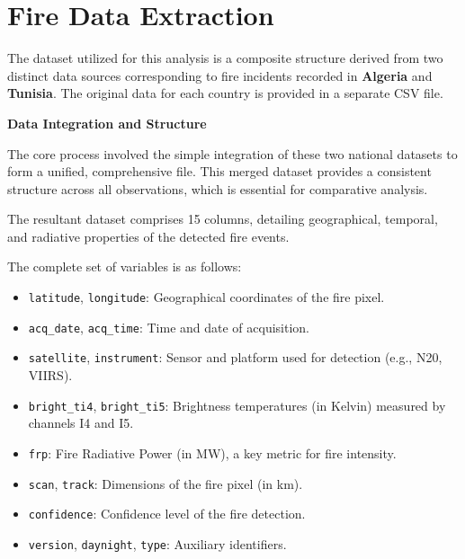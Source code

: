 \section{Fire Data Extraction}

\label{sec:dataset_composition}

The dataset utilized for this analysis is a composite structure derived from two distinct data sources corresponding to fire incidents recorded in \textbf{Algeria} and \textbf{Tunisia}. The original data for each country is provided in a separate CSV file.

\textbf{Data Integration and Structure}

The core process involved the simple integration of these two national datasets to form a unified, comprehensive file. This merged dataset provides a consistent structure across all observations, which is essential for comparative analysis.

The resultant dataset comprises 15 columns, detailing geographical, temporal, and radiative properties of the detected fire events. 

The complete set of variables is as follows:
\begin{itemize}
    \item \texttt{latitude}, \texttt{longitude}: Geographical coordinates of the fire pixel.
    \item \texttt{acq\_date}, \texttt{acq\_time}: Time and date of acquisition.
    \item \texttt{satellite}, \texttt{instrument}: Sensor and platform used for detection (e.g., N20, VIIRS).
    \item \texttt{bright\_ti4}, \texttt{bright\_ti5}: Brightness temperatures (in Kelvin) measured by channels I4 and I5.
    \item \texttt{frp}: Fire Radiative Power (in MW), a key metric for fire intensity.
    \item \texttt{scan}, \texttt{track}: Dimensions of the fire pixel (in km).
    \item \texttt{confidence}: Confidence level of the fire detection.
    \item \texttt{version}, \texttt{daynight}, \texttt{type}: Auxiliary identifiers.
\end{itemize}



